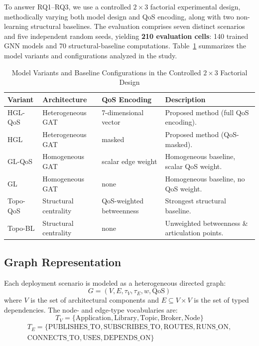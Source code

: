 \documentclass[review]{elsarticle}
\begin{document}
To answer RQ1--RQ3, we use a controlled $2\times3$ factorial experimental design, methodically
varying both model design and QoS encoding, along with two non-learning structural baselines. The
evaluation comprises seven distinct scenarios and five independent random seeds, yielding
\textbf{210 evaluation cells}: 140 trained GNN models and 70 structural-baseline computations.
Table~\ref{tab:variants} summarizes the model variants and configurations analyzed in the study.

\begin{table}[htbp]
\centering
\caption{Model Variants and Baseline Configurations in the Controlled $2\times3$ Factorial Design}
\label{tab:variants}
\small
\begin{tabular}{@{}l p{2.6cm} p{2.8cm} p{4.5cm}@{}}
\toprule
Variant & Architecture & QoS Encoding & Description \\
\midrule
HGL-QoS & Heterogeneous GAT & 7-dimensional vector & Proposed method (full QoS encoding). \\
HGL & Heterogeneous GAT & masked & Proposed method (QoS-masked). \\
GL-QoS & Homogeneous GAT & scalar edge weight & Homogeneous baseline, scalar QoS weight. \\
GL & Homogeneous GAT & none & Homogeneous baseline, no QoS weight. \\
Topo-QoS & Structural centrality & QoS-weighted betweenness & Strongest structural baseline. \\
Topo-BL & Structural centrality & none & Unweighted betweenness \& articulation points. \\
\bottomrule
\end{tabular}
\normalsize
\end{table}

\subsection{Graph Representation}
\label{sec:graphrep}

Each deployment scenario is modeled as a heterogeneous directed graph:
\[
G = (V, E, \tau_V, \tau_E, w, \text{QoS})
\]
where $V$ is the set of architectural components and $E \subseteq V \times V$ is the set of typed
dependencies. The node- and edge-type vocabularies are:
\[
T_V=\{\text{Application}, \text{Library}, \text{Topic}, \text{Broker}, \text{Node}\}
\]
\begin{multline*}
T_E=\{\text{PUBLISHES\_TO}, \text{SUBSCRIBES\_TO}, \text{ROUTES}, \text{RUNS\_ON}, \\
\text{CONNECTS\_TO}, \text{USES}, \text{DEPENDS\_ON}\}
\end{multline*}
\end{document}
